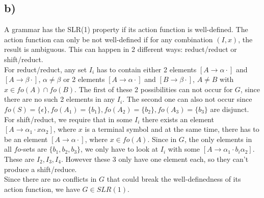 \subsection*{b)}
A grammar has the SLR(1) property if its action function is well-defined. The action function can only be not well-defined if for any combination $(I, x)$, the result is ambiguous. This can happen in 2 different ways: reduct/reduct or shift/reduct.\\
For reduct/reduct, any set $I_i$ has to contain either 2 elements $[A \rightarrow \alpha \cdot]$ and $[A \rightarrow \beta \cdot]$, $\alpha \neq \beta$ or 2 elements $[A \rightarrow \alpha \cdot]$ and $[B \rightarrow \beta \cdot]$, $A \neq B$ with $x \in fo(A) \cap fo(B)$. The first of these 2 possibilities can not occur for $G$, since there are no such 2 elements in any $I_i$. The second one can also not occur since $fo(S) = \{\epsilon\}, fo(A_1) = \{b_1\}, fo(A_2) = \{b_2\}, fo(A_3) = \{b_3\}$ are disjunct.\\
For shift/reduct, we require that in some $I_i$ there exists an element $[A \rightarrow \alpha_1 \cdot x \alpha_2]$, where $x$ is a terminal symbol and at the same time, there has to be an element $[A \rightarrow \alpha \cdot]$, where $x \in fo(A)$. Since in $G$, the only elements in all $fo$-sets are $\{ b_1, b_2, b_3\}$, we only have to look at $I_i$ with some $[A \rightarrow \alpha_1 \cdot b_i \alpha_2]$. These are $I_2, I_3, I_4$. However these 3 only have one element each, so they can't produce a shift/reduce.\\
Since there are no conflicts in $G$ that could break the well-definedness of its action function, we have $G \in SLR(1)$.